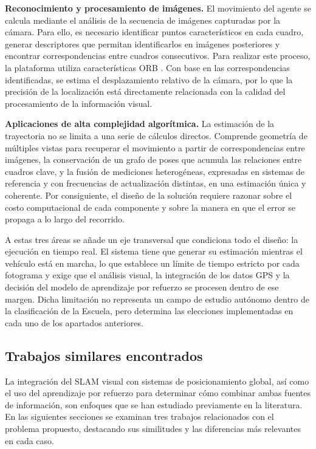 \textbf{Reconocimiento y procesamiento de imágenes.} El movimiento del agente se calcula mediante el análisis de la secuencia de imágenes capturadas por la cámara.
Para ello, es necesario identificar puntos característicos en cada cuadro, generar descriptores que permitan identificarlos en imágenes posteriores y encontrar correspondencias entre cuadros consecutivos. Para realizar este proceso, la plataforma utiliza características ORB \cite{rublee2011orb}.
Con base en las correspondencias identificadas, se estima el desplazamiento relativo de la cámara, por lo que la precisión de la localización está directamente relacionada con la calidad del procesamiento de la información visual.


\textbf{Aplicaciones de alta complejidad algorítmica.} La estimación de la trayectoria no se limita a una serie de cálculos directos.
Comprende geometría de múltiples vistas para recuperar el movimiento a partir de correspondencias entre imágenes, la conservación de un grafo de poses que acumula las relaciones entre cuadros clave, y la fusión de mediciones heterogéneas, expresadas en sistemas de referencia y con frecuencias de actualización distintas, en una estimación única y coherente.
Por consiguiente, el diseño de la solución requiere razonar sobre el costo computacional de cada componente y sobre la manera en que el error se propaga a lo largo del recorrido.

A estas tres áreas se añade un eje transversal que condiciona todo el diseño: la ejecución en tiempo real.
El sistema tiene que generar su estimación mientras el vehículo está en marcha, lo que establece un límite de tiempo estricto por cada fotograma y exige que el análisis visual, la integración de los datos GPS y la decisión del modelo de aprendizaje por refuerzo se procesen dentro de ese margen.
Dicha limitación no representa un campo de estudio autónomo dentro de la clasificación de la Escuela, pero determina las elecciones implementadas en cada uno de los apartados anteriores.

\subsection{Trabajos similares encontrados}
\label{sec:trabajos-similares}

La integración del SLAM visual con sistemas de posicionamiento global, así como el uso del aprendizaje por refuerzo para determinar cómo combinar ambas fuentes de información, son enfoques que se han estudiado previamente en la literatura.
En las siguientes secciones se examinan tres trabajos relacionados con el problema propuesto, destacando sus similitudes y las diferencias más relevantes en cada caso.
 
